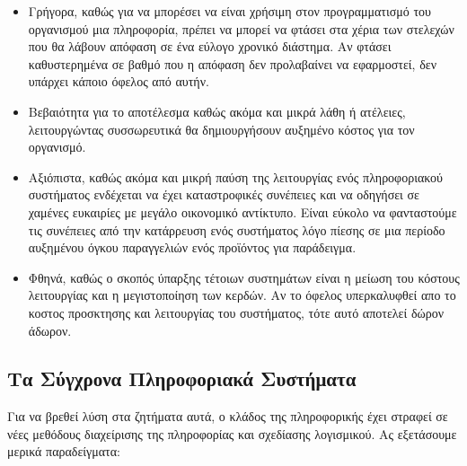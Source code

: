 \documentclass{article}
\begin{document}
\begin{itemize}
\item Γρήγορα, καθώς για να μπορέσει να είναι χρήσιμη στον προγραμματισμό του οργανισμού μια πληροφορία, πρέπει να μπορεί να φτάσει στα χέρια των στελεχών που θα λάβουν απόφαση σε ένα εύλογο χρονικό διάστημα. Αν φτάσει καθυστερημένα σε βαθμό που η απόφαση δεν προλαβαίνει να εφαρμοστεί, δεν υπάρχει κάποιο όφελος από αυτήν.
\item Βεβαιότητα για το αποτέλεσμα καθώς ακόμα και μικρά λάθη ή ατέλειες, λειτουργώντας συσσωρευτικά θα δημιουργήσουν αυξημένο κόστος για τον οργανισμό.
\item Αξιόπιστα, καθώς ακόμα και μικρή παύση της λειτουργίας ενός πληροφοριακού συστήματος ενδέχεται να έχει καταστροφικές συνέπειες και να οδηγήσει σε χαμένες ευκαιρίες με μεγάλο οικονομικό αντίκτυπο. Είναι εύκολο να φανταστούμε τις συνέπειες από την κατάρρευση ενός συστήματος λόγο πίεσης σε μια περίοδο αυξημένου όγκου παραγγελιών ενός προϊόντος για παράδειγμα.
\item Φθηνά, καθώς ο σκοπός ύπαρξης τέτοιων συστημάτων είναι η μείωση του κόστους λειτουργίας και η μεγιστοποίηση των κερδών. Αν το όφελος υπερκαλυφθεί απο το κοστος προσκτησης και λειτουργίας του συστήματος, τότε αυτό αποτελεί δώρον άδωρον.
\end{itemize}

\subsection{Τα Σύγχρονα Πληροφοριακά Συστήματα}
Για να βρεθεί λύση στα ζητήματα αυτά, ο κλάδος της πληροφορικής έχει στραφεί σε νέες  μεθόδους διαχείρισης της πληροφορίας και σχεδίασης λογισμικού. Ας εξετάσουμε μερικά παραδείγματα:
\end{document}
